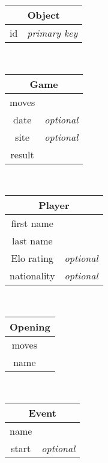 \documentclass{article}
\begin{document}
\begin{table}[ht!]
    \begin{subtable}{3.5cm}
	\begin{tabular}[t]{|cr|}
	\hline
	\multicolumn{2}{|c|}{\textbf{Object}} \\
	\hline 
	id & \em{primary key} \\
	\hline
	\end{tabular}
    \end{subtable}
    ~
    \begin{subtable}{3.5cm}
	\begin{tabular}[t]{|cr|}
	\hline
	\multicolumn{2}{|c|}{\textbf{Game}} \\
	\hline 
	moves  &                  \\
	date   & \em{optional}    \\
	site   & \em{optional}    \\
	result &                  \\
	\hline
	\end{tabular}
    \end{subtable}
    ~
    \begin{subtable}{3.5cm}
	\begin{tabular}[t]{|cr|}
	\hline
	\multicolumn{2}{|c|}{\textbf{Player}} \\
	\hline 
	first name   &                  \\
	last name    &                  \\
	Elo rating   & \em{optional}    \\
	nationality  & \em{optional}    \\
	\hline
	\end{tabular}
    \end{subtable}
    ~
    \begin{subtable}{3.5cm}
	\begin{tabular}[t]{|cr|}
	\hline
	\multicolumn{2}{|c|}{\textbf{Opening}} \\
	\hline
	moves  &                  \\
	name   &                  \\
	\hline
	\end{tabular}
    \end{subtable}
    ~
    \begin{subtable}{3.5cm}
	\begin{tabular}[t]{|cr|}
	\hline
	\multicolumn{2}{|c|}{\textbf{Event}} \\
	\hline
	name   &                  \\
	start  & \em{optional}    \\

\end{tabular}
\end{subtable}
\end{table}
\end{document}
